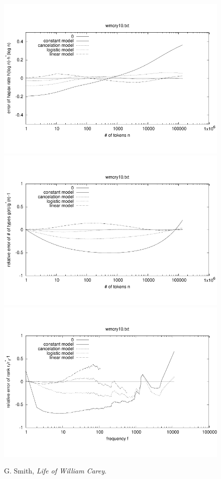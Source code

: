 \documentclass[a4paper,12pt]{article}
\begin{document}
\begin{figure}[p]
  \centering
  \vspace{-2em}
  \includegraphics[width=0.8\columnwidth]{output/herdan/wmcry10_27/token_ratio_residual.pdf}
  \\[-3em]
  \includegraphics[width=0.8\columnwidth]{output/herdan/wmcry10_27/token_residual.pdf}
  \\[-3em]
  \includegraphics[width=0.8\columnwidth]{output/herdan/wmcry10_27/frequency_residual.pdf}
  \vspace{-2em}
  \caption{G. Smith, \emph{Life of William Carey}.\label{figwmcry10R}}
\end{figure}



\end{document}
